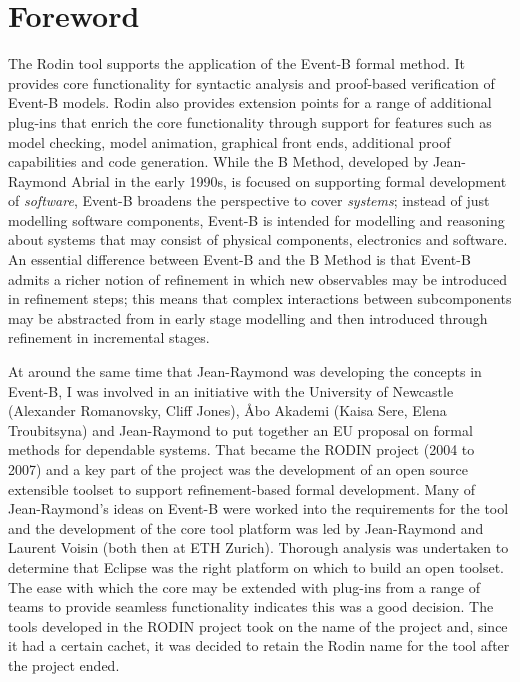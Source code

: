 \documentclass[twoside,10pt]{book}
\begin{document}
\chapter*{Foreword}
\label{foreword}

The Rodin tool supports the application of the Event-B formal method.  It provides core functionality for syntactic analysis and proof-based verification of Event-B models. Rodin also provides extension points for a range of additional plug-ins that enrich the core functionality through support for features such as model checking, model animation, graphical front ends, additional proof capabilities and code generation. While the B Method, developed by Jean-Raymond Abrial in the early 1990s, is focused on supporting formal development of \textit{software}, Event-B broadens the perspective to cover \textit{systems}; instead of just modelling software components, Event-B is intended for modelling and reasoning about systems that may consist of physical components, electronics and software.  An essential difference between Event-B and the B Method is that Event-B admits a richer notion of refinement in which new observables may be introduced in refinement steps; this means that complex interactions between subcomponents may be abstracted from in early stage modelling and then introduced through refinement in incremental stages.  

At around the same time that Jean-Raymond was developing the concepts in Event-B, I was involved in an initiative with the University of Newcastle (Alexander Romanovsky, Cliff Jones), {\AA}bo Akademi  (Kaisa Sere, Elena Troubitsyna) and Jean-Raymond to put together an EU proposal on formal methods for dependable systems.  That became the RODIN project (2004 to 2007) and a key part of the project was the development of an open source extensible toolset to support refinement-based formal development.  Many of Jean-Raymond’s ideas on Event-B were worked into the requirements for the tool and the development of the core tool platform was led by Jean-Raymond and Laurent Voisin (both then at ETH Zurich). Thorough analysis was undertaken to determine that Eclipse was the right platform on which to build an open toolset.  The ease with which the core may be extended with plug-ins from a range of teams to provide seamless functionality indicates this was a good decision. The tools developed in the RODIN project took on the name of the project and, since it had a certain cachet, it was decided to retain the Rodin name for the tool after the project ended.
\end{document}
